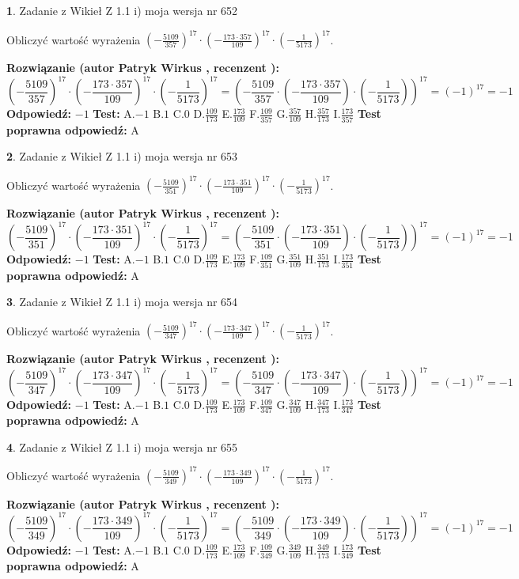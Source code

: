 \documentclass[12pt, a4paper]{article}
\theoremstyle{definition} %
\newtheorem{zad}{}
\newcommand{\zadStart}[1]{\begin{zad}#1\newline}
\newcommand{\zadStop}{\end{zad}}
\newcommand{\rozwStart}[2]{\noindent \textbf{Rozwiązanie (autor #1 , recenzent #2): }\newline}
\newcommand{\rozwStop}{\newline}
\newcommand{\odpStart}{\noindent \textbf{Odpowiedź:}\newline}
\newcommand{\odpStop}{\newline}
\newcommand{\testStart}{\noindent \textbf{Test:}\newline}
\newcommand{\testStop}{\newline}
\newcommand{\kluczStart}{\noindent \textbf{Test poprawna odpowiedź:}\newline}
\newcommand{\kluczStop}{\newline}
\begin{document}
\zadStart{Zadanie z Wikieł Z 1.1 i) moja wersja nr 652}

Obliczyć wartość wyrażenia $(-\frac{5109}{357})^{17} \cdot (-\frac{173 \cdot 357}{109})^{17} \cdot (-\frac{1}{5173})^{17}$.
\zadStop
\rozwStart{Patryk Wirkus}{}
$$(-\frac{5109}{357})^{17} \cdot (-\frac{173 \cdot 357}{109})^{17} \cdot (-\frac{1}{5173})^{17} = (-\frac{5109}{357} \cdot (-\frac{173 \cdot 357}{109}) \cdot (-\frac{1}{5173}))^{17} = (-1)^{17} = -1$$
\rozwStop
\odpStart
$-1$
\odpStop
\testStart
A.$-1$ B.$1$ C.$0$ D.$\frac{109}{173}$ E.$\frac{173}{109}$
F.$\frac{109}{357}$ G.$\frac{357}{109}$
H.$\frac{357}{173}$
I.$\frac{173}{357}$
\testStop
\kluczStart
A
\kluczStop



\zadStart{Zadanie z Wikieł Z 1.1 i) moja wersja nr 653}

Obliczyć wartość wyrażenia $(-\frac{5109}{351})^{17} \cdot (-\frac{173 \cdot 351}{109})^{17} \cdot (-\frac{1}{5173})^{17}$.
\zadStop
\rozwStart{Patryk Wirkus}{}
$$(-\frac{5109}{351})^{17} \cdot (-\frac{173 \cdot 351}{109})^{17} \cdot (-\frac{1}{5173})^{17} = (-\frac{5109}{351} \cdot (-\frac{173 \cdot 351}{109}) \cdot (-\frac{1}{5173}))^{17} = (-1)^{17} = -1$$
\rozwStop
\odpStart
$-1$
\odpStop
\testStart
A.$-1$ B.$1$ C.$0$ D.$\frac{109}{173}$ E.$\frac{173}{109}$
F.$\frac{109}{351}$ G.$\frac{351}{109}$
H.$\frac{351}{173}$
I.$\frac{173}{351}$
\testStop
\kluczStart
A
\kluczStop



\zadStart{Zadanie z Wikieł Z 1.1 i) moja wersja nr 654}

Obliczyć wartość wyrażenia $(-\frac{5109}{347})^{17} \cdot (-\frac{173 \cdot 347}{109})^{17} \cdot (-\frac{1}{5173})^{17}$.
\zadStop
\rozwStart{Patryk Wirkus}{}
$$(-\frac{5109}{347})^{17} \cdot (-\frac{173 \cdot 347}{109})^{17} \cdot (-\frac{1}{5173})^{17} = (-\frac{5109}{347} \cdot (-\frac{173 \cdot 347}{109}) \cdot (-\frac{1}{5173}))^{17} = (-1)^{17} = -1$$
\rozwStop
\odpStart
$-1$
\odpStop
\testStart
A.$-1$ B.$1$ C.$0$ D.$\frac{109}{173}$ E.$\frac{173}{109}$
F.$\frac{109}{347}$ G.$\frac{347}{109}$
H.$\frac{347}{173}$
I.$\frac{173}{347}$
\testStop
\kluczStart
A
\kluczStop



\zadStart{Zadanie z Wikieł Z 1.1 i) moja wersja nr 655}

Obliczyć wartość wyrażenia $(-\frac{5109}{349})^{17} \cdot (-\frac{173 \cdot 349}{109})^{17} \cdot (-\frac{1}{5173})^{17}$.
\zadStop
\rozwStart{Patryk Wirkus}{}
$$(-\frac{5109}{349})^{17} \cdot (-\frac{173 \cdot 349}{109})^{17} \cdot (-\frac{1}{5173})^{17} = (-\frac{5109}{349} \cdot (-\frac{173 \cdot 349}{109}) \cdot (-\frac{1}{5173}))^{17} = (-1)^{17} = -1$$
\rozwStop
\odpStart
$-1$
\odpStop
\testStart
A.$-1$ B.$1$ C.$0$ D.$\frac{109}{173}$ E.$\frac{173}{109}$
F.$\frac{109}{349}$ G.$\frac{349}{109}$
H.$\frac{349}{173}$
I.$\frac{173}{349}$
\testStop
\kluczStart
A
\kluczStop
\end{document}
